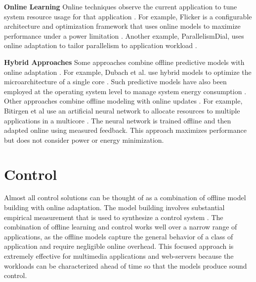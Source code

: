 \noindent \textbf{Online Learning} Online techniques observe the
current application to tune system resource usage for that application
\cite{Li2006,Flicker,ParallelismDial,Ponamarev,petabricksDynamic,LeeBrooks}.
For example, Flicker is a configurable architecture and optimization
framework that uses online models to maximize performance under a
power limitation \cite{Flicker}.  Another example, ParallelismDial,
uses online adaptation to tailor parallelism to application workload
\cite{ParallelismDial}.



\noindent \textbf{Hybrid Approaches} Some approaches combine offline
predictive models with online adaptation
\cite{Zhang2012,packandcap,Winter2010,dubach2010,Koala,Cinder,
  wu2012inferred}.  For example, Dubach et al.  use hybrid models to
optimize the microarchitecture of a single core \cite{dubach2010}.
Such predictive models have also been employed at the operating system
level to manage system energy consumption
\cite{Koala,Cinder,wu2012inferred}.  Other approaches combine offline
modeling with online updates \cite{JouleGuard,Bitirgen2008,Ipek}.  For
example, Bitirgen et al use an artificial neural network to allocate
resources to multiple applications in a multicore \cite{Bitirgen2008}.
The neural network is trained offline and then adapted online using
measured feedback.  This approach maximizes performance but does not
consider power or energy minimization.

\section{Control}
Almost all control solutions can be thought of as a combination of
offline model building with online adaptation.  The model building
involves substantial empirical measurement that is used to synthesize
a control system
\cite{Wu2004,TCST,Chen2011,PTRADE,POET,ControlWare,Agilos,Rajkumar,Sojka,Raghavendra2008}.
The combination of offline learning and control works well over a
narrow range of applications, as the offline models capture the
general behavior of a class of application and require negligible
online overhead.  This focused approach is extremely effective for
multimedia applications \cite{grace2,flinn99,flinn2004,xtune,TCST} and
web-servers \cite{Horvarth,LuEtAl-2006a,SunDaiPan-2008a} because the
workloads can be characterized ahead of time so that the models
produce sound control.

